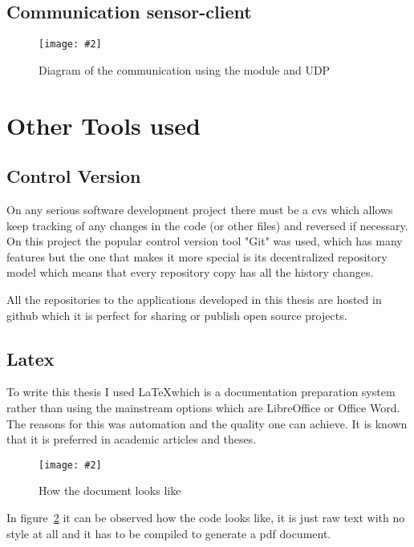 \documentclass[hidelinks,11pt,a4paper,oneside,article]{memoir}
\newcommand{\putimage}[3][10] %
{
\begin{figure}[h]
	\centering
	\captionsetup{justification=centering}
	\texttt{[image: \#2]}
	\caption{#3}
	\label{fig:#2}
\end{figure}
}
\begin{document}
\subsection{Communication sensor-client}
\putimage{communication_udp}{Diagram of the communication using the module and UDP}

\section{Other Tools used}

\subsection{Control Version}
On any serious software development project there must be a \gls{cvs} which allows keep tracking of any changes in the code (or other files) and reversed if necessary. On this project the popular control version tool "Git" was used, which has many features but the one that makes it more special is its decentralized repository model which means that every repository copy has all the history changes.

All the repositories to the applications developed in this thesis are hosted in \gls{github} which it is perfect for sharing or publish open source projects.

\subsection{Latex}
To write this thesis I used \LaTeX which is a documentation preparation system rather than using the mainstream options which are LibreOffice or Office Word. The reasons for this was automation and the quality one can achieve. It is known that it is preferred in academic articles and theses.

    \putimage{latex-look}{How the document looks like}
    
In figure~\ref{fig:latex-look} it can be observed how the code looks like, it is just raw text with no style at all and it has to be compiled to generate a \gls{pdf} document.
\end{document}

